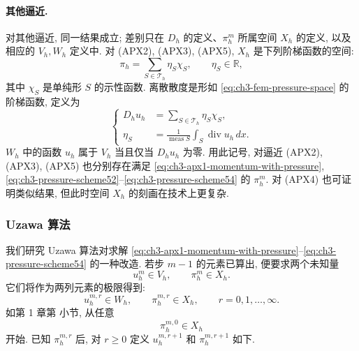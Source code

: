 \paragraph{其他逼近.}
对其他逼近, 同一结果成立; 差别只在 $D_h$ 的定义、$\pi_h^m$ 所属空间 $X_h$ 的定义, 以及相应的 $V_h,W_h$ 定义中. 对 (APX2), (APX3), (APX5), $X_h$ 是下列阶梯函数的空间:
\begin{equation}
\pi_h=\sum_{S\in\mathcal T_h}\eta_S\chi_S,
\qquad\eta_S\in\mathbb R,
\label{eq:ch3-fem-pressure-space}
\end{equation}
其中 $\chi_S$ 是单纯形 $S$ 的示性函数. 离散散度是形如 \eqref{eq:ch3-fem-pressure-space} 的阶梯函数, 定义为
\begin{equation}
\left\{
\begin{aligned}
D_hu_h&=\sum_{S\in\mathcal T_h}\eta_S\chi_S,\\
\eta_S&=\frac1{\operatorname{meas}S}\int_S\operatorname{div}u_h\,dx.
\end{aligned}
\right.
\label{eq:ch3-fem-discrete-divergence}
\end{equation}
$W_h$ 中的函数 $u_h$ 属于 $V_h$ 当且仅当 $D_hu_h$ 为零. 用此记号, 对逼近 (APX2), (APX3), (APX5) 也分别存在满足 \eqref{eq:ch3-apx1-momentum-with-pressure}, \eqref{eq:ch3-pressure-scheme52}--\eqref{eq:ch3-pressure-scheme54} 的 $\pi_h^m$. 对 (APX4) 也可证明类似结果, 但此时空间 $X_h$ 的刻画在技术上更复杂.

\subsubsection{Uzawa 算法}
我们研究 Uzawa 算法对求解 \eqref{eq:ch3-apx1-momentum-with-pressure}--\eqref{eq:ch3-pressure-scheme54} 的一种改造. 若步 $m-1$ 的元素已算出, 便要求两个未知量
\begin{equation}
u_h^m\in V_h,\qquad\pi_h^m\in X_h.
\label{eq:ch3-uzawa-unknowns}
\end{equation}
它们将作为两列元素的极限得到:
\begin{equation}
u_h^{m,r}\in W_h,\qquad\pi_h^{m,r}\in X_h,
\qquad r=0,1,\ldots,\infty.
\label{eq:ch3-uzawa-sequences}
\end{equation}
如第 1 章第  小节, 从任意
\begin{equation}
\pi_h^{m,0}\in X_h
\label{eq:ch3-uzawa-initial-pressure}
\end{equation}
开始. 已知 $\pi_h^{m,r}$ 后, 对 $r\geq0$ 定义 $u_h^{m,r+1}$ 和 $\pi_h^{m,r+1}$ 如下.


